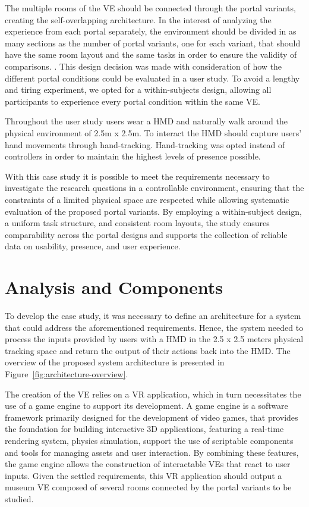 The multiple rooms of the \gls{VE} should be connected through the portal variants, creating the self-overlapping architecture. In the interest 
of analyzing the experience from each portal separately, the environment should be divided in as many sections as the number of portal variants, one 
for each variant, that should have the same room layout and the same tasks in order to ensure the validity of comparisons.
. This design decision was made with consideration of how the different portal conditions could be evaluated in a user study. 
To avoid a lengthy and tiring experiment, we opted for a within-subjects design, allowing all participants to experience every 
portal condition within the same VE.

Throughout the user study users wear a \gls{HMD} and naturally walk around the physical environment of 2.5m x 2.5m. To interact the \gls{HMD} 
should capture users' hand movements through hand-tracking. Hand-tracking was opted instead of controllers in order to maintain the highest levels 
of presence possible. 

With this case study it is possible to meet the requirements necessary to investigate the research questions in a controllable environment, 
ensuring that the constraints of a limited physical space are respected while allowing systematic evaluation of the proposed portal variants. 
By employing a within-subject design, a uniform task structure, and consistent room layouts, the study ensures comparability across the 
portal designs and supports the collection of reliable data on usability, presence, and user experience.

\section{Analysis and Components}
\label{sec:architecture}

To develop the case study, it was necessary to define an architecture for a system that could address the aforementioned requirements.
Hence, the system needed to process the inputs provided by users with a \gls{HMD} in the 2.5 x 2.5 meters physical tracking space and 
return the output of their actions back into the \gls{HMD}.
The overview of the proposed system architecture is presented in Figure~\ref{fig:architecture-overview}.

The creation of the \gls{VE} relies on a \gls{VR} application, which in turn necessitates the use of a game engine to support its development.
A game engine is a software framework primarily designed for the development of video games, that provides the foundation for building 
interactive 3D applications, featuring a real-time rendering system, physics simulation, support the use of scriptable components and 
tools for managing assets and user interaction. By combining these features, the game engine allows the construction of interactable \glspl{VE}
that react to user inputs. Given the settled requirements, this \gls{VR} application should output a museum \gls{VE} composed of several 
rooms connected by the portal variants to be studied. 


